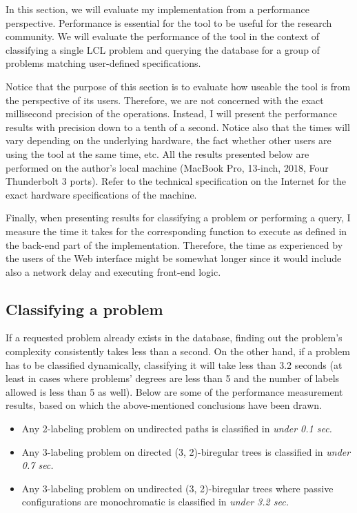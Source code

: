 In this section, we will evaluate my implementation from a
performance perspective. Performance is essential for
the tool to be useful for the research community.
We will evaluate the performance of the tool
in the context of classifying a single LCL problem and
querying the database for a group
of problems matching user-defined specifications.

Notice that the purpose of this section is to evaluate how
useable the tool is from the perspective of its users.
Therefore, we are not concerned with the exact millisecond
precision of the operations. Instead, I will present
the performance results with precision down to a tenth of a second.
Notice also that the times will vary depending on the underlying
hardware, the fact whether other users are using the tool at the same
time, etc. All the results presented below are performed on the
author's local machine (MacBook Pro, 13-inch, 2018, Four Thunderbolt 3 ports).
Refer to the technical specification on the Internet for the exact
hardware specifications of the machine.

Finally, when presenting results for classifying a problem or
performing a query, I measure the time it takes
for the corresponding function to execute as defined in the back-end
part of the implementation. Therefore, the time as experienced by the users of
the Web interface might be somewhat longer since it would include
also a network delay and executing front-end logic.

\subsection{Classifying a problem}

If a requested problem already exists in the database, finding out
the problem's complexity consistently takes less than a second.
On the other hand, if a problem has to be classified dynamically,
classifying it will take less than 3.2 seconds (at
least in cases where
problems' degrees are less than 5 and the number of labels allowed is less
than 5 as well). Below are some of the performance measurement results,
based on which the above-mentioned conclusions have been drawn.

\begin{itemize}
  \item Any 2-labeling problem on undirected paths is classified in \emph{under 0.1 sec.}
  \item Any 3-labeling problem on directed (3, 2)-biregular trees is classified in \emph{under 0.7 sec.}
  \item Any 3-labeling problem on undirected (3, 2)-biregular trees where passive configurations are monochromatic is classified in \emph{under 3.2 sec.}
\end{itemize}

